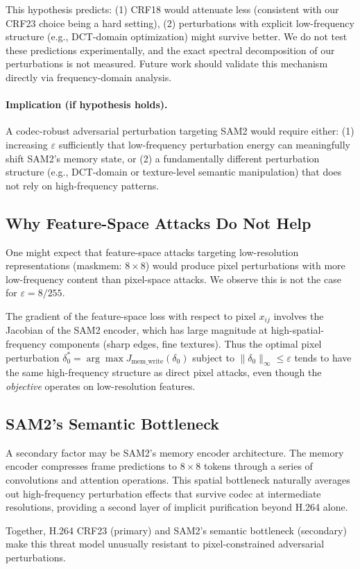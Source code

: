 This hypothesis predicts: (1) CRF18 would attenuate less (consistent with our CRF23 choice being a hard setting), (2) perturbations with explicit low-frequency structure (e.g., DCT-domain optimization) might survive better. We do not test these predictions experimentally, and the exact spectral decomposition of our perturbations is not measured. Future work should validate this mechanism directly via frequency-domain analysis.

\paragraph{Implication (if hypothesis holds).}
A codec-robust adversarial perturbation targeting SAM2 would require either: (1) increasing $\varepsilon$ sufficiently that low-frequency perturbation energy can meaningfully shift SAM2's memory state, or (2) a fundamentally different perturbation structure (e.g., DCT-domain or texture-level semantic manipulation) that does not rely on high-frequency patterns.

\subsection{Why Feature-Space Attacks Do Not Help}

One might expect that feature-space attacks targeting low-resolution representations (maskmem: $8 \times 8$) would produce pixel perturbations with more low-frequency content than pixel-space attacks. We observe this is not the case for $\varepsilon = 8/255$.

The gradient of the feature-space loss with respect to pixel $x_{ij}$ involves the Jacobian of the SAM2 encoder, which has large magnitude at high-spatial-frequency components (sharp edges, fine textures). Thus the optimal pixel perturbation $\delta_0^* = \arg\max J_\text{mem\_write}(\delta_0)$ subject to $\|\delta_0\|_\infty \leq \varepsilon$ tends to have the same high-frequency structure as direct pixel attacks, even though the \emph{objective} operates on low-resolution features.

\subsection{SAM2's Semantic Bottleneck}

A secondary factor may be SAM2's memory encoder architecture. The memory encoder compresses frame predictions to $8 \times 8$ tokens through a series of convolutions and attention operations. This spatial bottleneck naturally averages out high-frequency perturbation effects that survive codec at intermediate resolutions, providing a second layer of implicit purification beyond H.264 alone.

Together, H.264 CRF23 (primary) and SAM2's semantic bottleneck (secondary) make this threat model unusually resistant to pixel-constrained adversarial perturbations.
